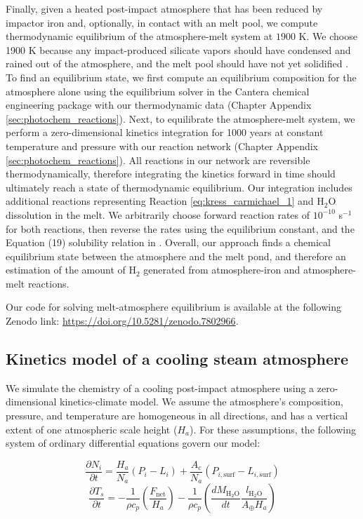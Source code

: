 Finally, given a heated post-impact atmosphere that has been reduced by impactor iron and, optionally, in contact with an melt pool, we compute thermodynamic equilibrium of the atmosphere-melt system at $1900$ K. We choose 1900 K because any impact-produced silicate vapors should have condensed and rained out of the atmosphere, and the melt pool should have not yet solidified \citep{Itcovitz_2022}. To find an equilibrium state, we first compute an equilibrium composition for the atmosphere alone using the equilibrium solver in the Cantera chemical engineering package \citep{Goodwin_2022} with our thermodynamic data (Chapter Appendix \ref{sec:photochem_reactions}). Next, to equilibrate the atmosphere-melt system, we perform a zero-dimensional kinetics integration for 1000 years at constant temperature and pressure with our reaction network (Chapter Appendix \ref{sec:photochem_reactions}). All reactions in our network are reversible thermodynamically, therefore integrating the kinetics forward in time should ultimately reach a state of thermodynamic equilibrium. Our integration includes additional reactions representing Reaction \ref{eq:kress_carmichael_1} and H$_2$O dissolution in the melt. We arbitrarily choose forward reaction rates of $10^{-10}$ s$^{-1}$ for both reactions, then reverse the rates using the \citet{Kress_1991} equilibrium constant, and the Equation (19) solubility relation in \citet{Itcovitz_2022}. Overall, our approach finds a chemical equilibrium state between the atmosphere and the melt pond, and therefore an estimation of the amount of H$_2$ generated from atmosphere-iron and atmosphere-melt reactions.

Our code for solving melt-atmosphere equilibrium is available at the following Zenodo link: \url{https://doi.org/10.5281/zenodo.7802966}.

\subsection{Kinetics model of a cooling steam atmosphere} \label{sec:kinetics_climate}

We simulate the chemistry of a cooling post-impact atmosphere using a zero-dimensional kinetics-climate model. We assume the atmosphere's composition, pressure, and temperature are homogeneous in all directions, and has a vertical extent of one atmospheric scale height ($H_a$). For these assumptions, the following system of ordinary differential equations govern our model:

\begin{equation} \label{eq:prod_loss}
  \frac{\partial N_i}{\partial t} = \frac{H_a}{N_a} (P_i - L_i) + \frac{A_c}{N_a} (P_{i,\text{surf}} - L_{i,\text{surf}})
\end{equation}
\begin{equation} \label{eq:temp}
  \frac{\partial T_s}{\partial t} = -\frac{1}{\rho c_p} \left(\frac{F_\text{net}}{H_a}\right) - \frac{1}{\rho c_p}\left(\frac{d M_\mathrm{H_2O}}{dt} \frac{l_\mathrm{H_2O}}{A_\oplus H_a}\right) 
\end{equation}


